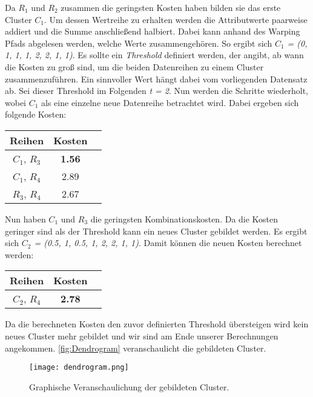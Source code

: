 Da \emph{$R_{1}$} und \emph{$R_{2}$} zusammen die geringsten Kosten haben bilden sie das erste Cluster \emph{$C_{1}$}.
Um dessen Wertreihe zu erhalten werden die Attributwerte paarweise addiert und die Summe anschließend halbiert.
Dabei kann anhand des Warping Pfads abgelesen werden, welche Werte zusammengehören.
So ergibt sich \emph{$C_{1}$ = (0, 1, 1, 1, 2, 2, 1, 1)}.
Es sollte ein \emph{Threshold} definiert werden,
der angibt, ab wann die Kosten zu groß sind, um die beiden Datenreihen zu einem Cluster zusammenzuführen.
Ein sinnvoller Wert hängt dabei vom vorliegenden Datensatz ab.
Sei dieser Threshold im Folgenden \emph{t = 2}.
Nun werden die Schritte wiederholt, wobei \emph{$C_{1}$} als eine einzelne neue Datenreihe betrachtet wird.
Dabei ergeben sich folgende Kosten:
\begin{center}
    \begin{tabular}{ |c|c|c| } 
     \hline
     Reihen & Kosten \\
     \hline \hline
     $C_{1}$, $R_{3}$ & \textbf{1.56} \\
     \hline
     $C_{1}$, $R_{4}$ & 2.89 \\
     \hline
     $R_{3}$, $R_{4}$ & 2.67 \\
     \hline
    \end{tabular}
\end{center}
Nun haben \emph{$C_{1}$} und \emph{$R_{3}$} die geringsten Kombinationskosten.
Da die Kosten geringer sind als der Threshold kann ein neues Cluster gebildet werden.
Es ergibt sich \emph{$C_{2}$ = (0.5, 1, 0.5, 1, 2, 2, 1, 1)}.
Damit können die neuen Kosten berechnet werden:
\begin{center}
    \begin{tabular}{ |c|c|c| } 
     \hline
     Reihen & Kosten \\
     \hline \hline
     $C_{2}$, $R_{4}$ & \textbf{2.78} \\
     \hline
    \end{tabular}
\end{center}
Da die berechneten Kosten den zuvor definierten Threshold übersteigen wird kein neues Cluster mehr gebildet
und wir sind am Ende unserer Berechnungen angekommen.
\autoref{fig:Dendrogram} veranschaulicht die gebildeten Cluster.

\begin{figure}[ht]
    \begin{center}
    \texttt{[image: dendrogram.png]}
    \end{center}
    \caption{Graphische Veranschaulichung der gebildeten Cluster.}
    \label{fig:Dendrogram}
\end{figure}



